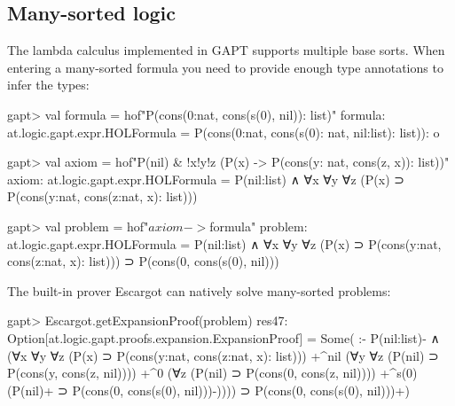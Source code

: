 \documentclass[a4paper,11pt]{article}
\begin{document}
\subsection{Many-sorted logic}

The lambda calculus implemented in GAPT supports multiple base sorts.  When
entering a many-sorted formula you need to provide enough type annotations to
infer the types:
\begin{clilisting}
gapt> val formula = hof"P(cons(0:nat, cons(s(0), nil)): list)"
formula: at.logic.gapt.expr.HOLFormula = P(cons(0:nat, cons(s(0): nat, nil:list): list)): o

gapt> val axiom = hof"P(nil) & !x!y!z (P(x) -> P(cons(y: nat, cons(z, x)): list))"
axiom: at.logic.gapt.expr.HOLFormula = P(nil:list) ∧ ∀x ∀y ∀z (P(x) ⊃ P(cons(y:nat, cons(z:nat, x): list)))

gapt> val problem = hof"$axiom -> $formula"
problem: at.logic.gapt.expr.HOLFormula =
P(nil:list) ∧ ∀x ∀y ∀z (P(x) ⊃ P(cons(y:nat, cons(z:nat, x): list))) ⊃
  P(cons(0, cons(s(0), nil)))

\end{clilisting}

The built-in prover Escargot can natively solve many-sorted problems:
\begin{clilisting}
gapt> Escargot.getExpansionProof(problem)
res47: Option[at.logic.gapt.proofs.expansion.ExpansionProof] =
Some(
:-
P(nil:list)- ∧
    (∀x ∀y ∀z (P(x) ⊃ P(cons(y:nat, cons(z:nat, x): list)))
      +^{nil}
        (∀y ∀z (P(nil) ⊃ P(cons(y, cons(z, nil))))
          +^{0}
            (∀z (P(nil) ⊃ P(cons(0, cons(z, nil))))
            +^{s(0)} (P(nil)+ ⊃ P(cons(0, cons(s(0), nil)))-)))) ⊃
  P(cons(0, cons(s(0), nil)))+)

\end{clilisting}
\end{document}
